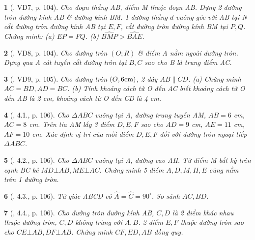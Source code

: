 \documentclass{article}
\newtheorem{baitoan}{}
\begin{document}
\begin{baitoan}[\cite{Binh_boi_duong_Toan_9_tap_1}, VD7, p. 104]
	Cho đoạn thẳng AB, điểm M thuộc đoạn AB. Dựng 2 đường tròn đường kính AB \& đường kính BM. 1 đường thẳng $d$ vuông góc với AB tại N cắt đường tròn đường kính AB tại $E,F$, cắt đường tròn đường kính BM tại $P,Q$. Chứng minh: (a) $EP = FQ$. (b) $\widehat{BMP} > \widehat{BAE}$.
\end{baitoan}

\begin{baitoan}[\cite{Binh_boi_duong_Toan_9_tap_1}, VD8, p. 104]
	Cho đường tròn $(O;R)$ \& điểm A nằm ngoài đường tròn. Dựng qua A cát tuyến cắt đường tròn tại $B,C$ sao cho B là trung điểm AC.
\end{baitoan}

\begin{baitoan}[\cite{Binh_boi_duong_Toan_9_tap_1}, VD9, p. 105]
	Cho đường tròn $(O,6{\rm cm})$, 2 dây $AB\parallel CD$. (a) Chứng minh $AC = BD,AD = BC$. (b) Tính khoảng cách từ O đến AC biết khoảng cách từ O đến AB là {\rm2 cm}, khoảng cách từ O đến CD là {\rm4 cm}.
\end{baitoan}

\begin{baitoan}[\cite{Binh_boi_duong_Toan_9_tap_1}, 4.1., p. 106]
	Cho $\Delta ABC$ vuông tại A, đường trung tuyến AM, $AB = 6$ {\rm cm}, $AC = 8$ {\rm cm}. Trên tia AM lấy 3 điểm $D,E,F$ sao cho $AD = 9$ {\rm cm}, $AE = 11$ {\rm cm}, $AF = 10$ {\rm cm}. Xác định vị trí của mỗi điểm $D,E,F$ đối với đường tròn ngoại tiếp $\Delta ABC$.
\end{baitoan}

\begin{baitoan}[\cite{Binh_boi_duong_Toan_9_tap_1}, 4.2., p. 106]
	Cho $\Delta ABC$ vuông tại A, đường cao AH. Từ điểm M bất kỳ trên cạnh BC kẻ $MD\bot AB,ME\bot AC$. Chứng minh 5 điểm $A,D,M,H,E$ cùng nằm trên 1 đường tròn.
\end{baitoan}

\begin{baitoan}[\cite{Binh_boi_duong_Toan_9_tap_1}, 4.3., p. 106]
	Tứ giác ABCD có $\widehat{A} = \widehat{C} = 90^\circ$. So sánh $AC,BD$.
\end{baitoan}

\begin{baitoan}[\cite{Binh_boi_duong_Toan_9_tap_1}, 4.4., p. 106]
	Cho đường tròn đường kính AB, $C,D$ là 2 điểm khác nhau thuộc đường tròn, $C,D$ không trùng với $A,B$. 2 điểm $E,F$ thuộc đường tròn sao cho $CE\bot AB,DF\bot AB$. Chứng minh $CF,ED,AB$ đồng quy.
\end{baitoan}
\end{document}
